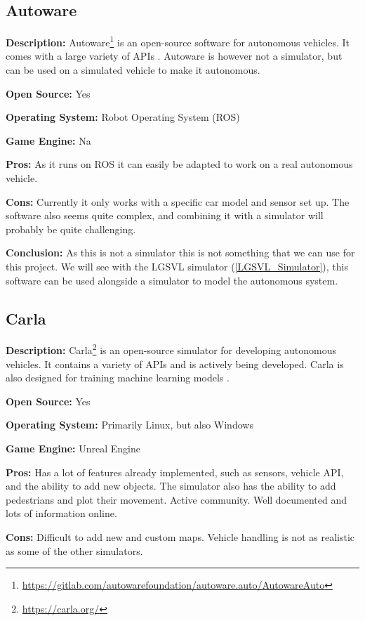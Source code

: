 \subsection{Autoware} \label{Autoware}
\textbf{Description:} Autoware\footnote{\url{https://gitlab.com/autowarefoundation/autoware.auto/AutowareAuto}} is an open-source software for autonomous vehicles. It comes with a large variety of APIs  \cite{Autoware_doc_Website}. Autoware is however not a simulator, but can be used on a simulated vehicle to make it autonomous.

\textbf{Open Source:} Yes

\textbf{Operating System:} Robot Operating System (ROS)

\textbf{Game Engine:} Na

\textbf{Pros:} As it runs on ROS it can easily be adapted to work on a real autonomous vehicle.

\textbf{Cons:} Currently it only works with a specific car model and sensor set up. The software also seems quite complex, and combining it with a simulator will probably be quite challenging.

\textbf{Conclusion:} As this is not a simulator this is not something that we can use for this project. We will see with the LGSVL simulator (\ref{LGSVL_Simulator}), this software can be used alongside a simulator to model the autonomous system. 


\subsection{Carla} \label{Carla}
\textbf{Description:} Carla\footnote{\url{https://carla.org/}} is an open-source simulator for developing autonomous vehicles. It contains a variety of APIs and is actively being developed. Carla is also designed for training machine learning models \cite{CarlaPaper}. 

\textbf{Open Source:} Yes

\textbf{Operating System:} Primarily Linux, but also Windows

\textbf{Game Engine:} Unreal Engine

\textbf{Pros:} Has a lot of features already implemented, such as sensors, vehicle API, and the ability to add new objects. The simulator also has the ability to add pedestrians and plot their movement. Active community. Well documented and lots of information online. 

\textbf{Cons:} Difficult to add new and custom maps. Vehicle handling is not as realistic as some of the other simulators.

